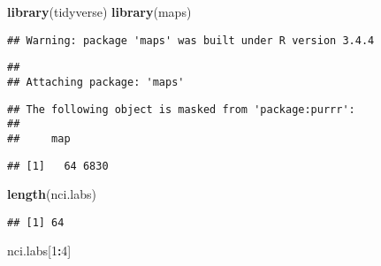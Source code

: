 \documentclass[]{article}
\newenvironment{Shaded}{\begin{snugshade}}{\end{snugshade}}
\newcommand{\KeywordTok}[1]{\textcolor[rgb]{0.13,0.29,0.53}{\textbf{#1}}}
\newcommand{\DecValTok}[1]{\textcolor[rgb]{0.00,0.00,0.81}{#1}}
\newcommand{\StringTok}[1]{\textcolor[rgb]{0.31,0.60,0.02}{#1}}
\newcommand{\CommentTok}[1]{\textcolor[rgb]{0.56,0.35,0.01}{\textit{#1}}}
\newcommand{\OperatorTok}[1]{\textcolor[rgb]{0.81,0.36,0.00}{\textbf{#1}}}
\newcommand{\NormalTok}[1]{#1}
\begin{document}
\begin{Shaded}
\begin{Highlighting}[]
\KeywordTok{library}\NormalTok{(tidyverse)}
\KeywordTok{library}\NormalTok{(maps)}
\end{Highlighting}
\end{Shaded}

\begin{verbatim}
## Warning: package 'maps' was built under R version 3.4.4
\end{verbatim}

\begin{verbatim}
## 
## Attaching package: 'maps'
\end{verbatim}

\begin{verbatim}
## The following object is masked from 'package:purrr':
## 
##     map
\end{verbatim}

\begin{Shaded}
\end{Shaded}

\begin{verbatim}
## [1]   64 6830
\end{verbatim}

\begin{Shaded}
\begin{Highlighting}[]
\KeywordTok{length}\NormalTok{(nci.labs)}
\end{Highlighting}
\end{Shaded}

\begin{verbatim}
## [1] 64
\end{verbatim}

\begin{Shaded}
\begin{Highlighting}[]
\NormalTok{nci.labs[}\DecValTok{1}\OperatorTok{:}\DecValTok{4}\NormalTok{]}
\end{Highlighting}
\end{Shaded}
\end{document}
